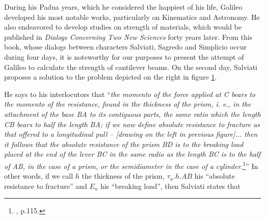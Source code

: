 During his Padua years, which he considered the happiest of his life, Galileo developed his most notable works, particularly on Kinematics and Astronomy. He also endeavored to develop studies on strength of materials, which would be published in \emph{Dialogs Concerning Two New Sciences} forty years later. From this book, whose dialogs between characters Salviati, Sagredo and Simplicio occur during four days, it is noteworthy for our purposes to present the  attempt of Galileo to calculate the strength of cantilever beams. On the second day, Salviati proposes a solution to the problem depicted on the right in figure \ref{fg:galileo}. 
\begin{figure}[!ht]
	\centering
	\begin{center}
	\end{center}
	\label{fg:galileo}
\end{figure}
He says to his interlocutors that ``\emph{the \emph{momento} of the force applied at C bears to the \emph{momento} of the resistance, found in the thickness of the prism, i. e., in the attachment of the base BA to its contiguous parts, the same ratio which the length CB bears to half the length BA; if we now define absolute resistance to fracture as that offered to a longitudinal pull -- \emph{[drawing on the left in previous figure]}... then it follows that the absolute resistance of the prism BD is to the breaking load placed at the end of the lever BC in the same radio as the length BC is to the half of AB, in the case of a prism, or the semidiameter in the case of a cylinder}.\footnote{\cite{galileo_1954_2}, p.115.}'' In other words, if we call $h$ the thickness of the prism, $\tau_u.h.AB$ his ``absolute resistance to fracture'' and $E_u$ his ``breaking load'', then Salviati states that 
